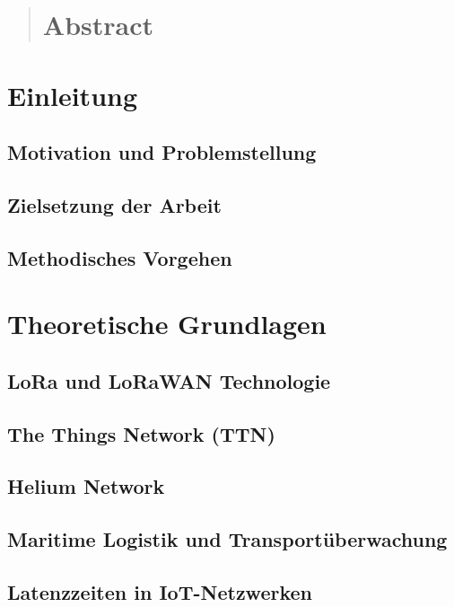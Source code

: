 \documentclass[
	a4paper,
	12pt,
	bibtotoc,
	listof=totoc,
	titlepage
]{scrartcl}
\begin{document}



\clearpage
\begin{abstract}
    \section{Abstract}
\end{abstract}

\clearpage
\tableofcontents

\clearpage
{}
\section{Einleitung}
\subsection{Motivation und Problemstellung}
\subsection{Zielsetzung der Arbeit}
\subsection{Methodisches Vorgehen}

\section{Theoretische Grundlagen}
\subsection{LoRa und LoRaWAN Technologie}
\subsection{The Things Network (TTN)}
\subsection{Helium Network}
\subsection{Maritime Logistik und Transportüberwachung}
\subsection{Latenzzeiten in IoT-Netzwerken}
\end{document}
